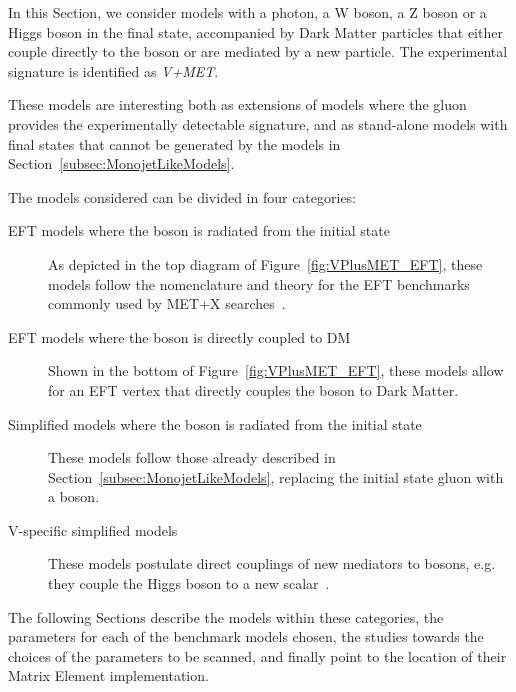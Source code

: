 
In this Section, we consider models with a photon, a W boson, a Z boson or a Higgs boson in the final state, 
accompanied by Dark Matter particles that either couple directly to the boson or are mediated by 
a new particle. The experimental signature is identified as \textit{V+MET}. 

These models are interesting both as extensions of models where the gluon provides 
the experimentally detectable signature, 
and as stand-alone models with final states that cannot be generated by the models in
Section~\ref{subsec:MonojetLikeModels}.


% 
The models considered can be divided in four categories:
\begin{description}
 \item[EFT models where the boson is radiated from the initial state] As depicted in 
 the top diagram of Figure~\ref{fig:VPlusMET_EFT}, these  models follow the nomenclature and theory 
 for the EFT benchmarks commonly used by MET+X searches~\cite{Goodman:2010ku}. 
 \item[EFT models where the boson is directly coupled to DM] Shown in the bottom of Figure~\ref{fig:VPlusMET_EFT},
 these models allow for an EFT vertex that directly couples the boson to Dark Matter. 
 \item[Simplified models where the boson is radiated from the initial state] These models follow those
 already described in Section~\ref{subsec:MonojetLikeModels}, replacing the initial state gluon with a boson.
 \item[V-specific simplified models] These models postulate direct couplings of new mediators
 to bosons, e.g. they couple the Higgs boson to a new scalar~\cite{Carpenter:2013xra}. 
\end{description}

The following Sections describe the models within these categories, 
the parameters for each of the benchmark models chosen,
the studies towards the choices of the parameters to be scanned, 
and finally point to the location of their Matrix Element 
implementation. 

